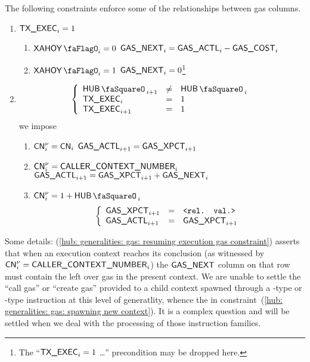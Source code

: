 The following constraints enforce some of the relationships between gas columns.
\begin{enumerate}
	\item \If $\textsf{TX}\textsf{\_EXEC}_{i} = 1$ \Then
		\begin{enumerate}
			\item \If $\xAhoy_{i} = 0$ \Then $\textsf{GAS}\textsf{\_NEXT}_{i} = \textsf{GAS}\textsf{\_ACTL}_{i} - \textsf{GAS}\textsf{\_COST}_{i}$
			\item \If $\xAhoy_{i} = 1$ \Then $\textsf{GAS}\textsf{\_NEXT}_{i} = 0$\footnote{The ``\If $\textsf{TX}\textsf{\_EXEC}_{i} = 1$ \Then \dots'' precondition may be dropped here.}
		\end{enumerate}
	\item \If 
		\[
			\left\{ \begin{array}{lcl}
				\hubStamp_{i + 1} & \neq & \hubStamp_{i} \\
				\txExec_{i}       & =    & 1             \\
				\txExec_{i + 1}   & =    & 1             \\
			\end{array} \right.
		\]
		\Then we impose
		\begin{enumerate}
			\item\label{hub: generalities: gas: could blow up} \If $\textsf{CN}^{\nu}_{i} = \textsf{CN}_{i}$ \Then $\textsf{GAS}\textsf{\_ACTL}_{i + 1} = \textsf{GAS}\textsf{\_XPCT}_{i + 1}$
			\item\label{hub: generalities: gas: resuming execution gas constraint} \If $\textsf{CN}^{\nu}_{i} = \textsf{CALLER\_CONTEXT\_NUMBER}_{i}$ \Then
				$\textsf{GAS}\textsf{\_ACTL}_{i + 1} = \textsf{GAS}\textsf{\_XPCT}_{i + 1} + \textsf{GAS}\textsf{\_NEXT}_{i}$
			\item\label{hub: generalities: gas: spawning new context} \If $\cn\new_{i} = 1 + \hubStamp_{i}$ \Then 
				\[
					\left\{ \begin{array}{lcl}
						\textsf{GAS}\textsf{\_XPCT}_{i + 1} & = & \texttt{<rel. val.>}            \\
						\textsf{GAS}\textsf{\_ACTL}_{i + 1}   & = & \textsf{GAS}\textsf{\_XPCT}_{i + 1} \\
					\end{array} \right.
				\]
		\end{enumerate}
\end{enumerate}
Some details:
(\ref{hub: generalities: gas: resuming execution gas constraint}) asserts that when an execution context reaches its conclusion (as witnessed by $\textsf{CN}^{\nu}_{i} = \textsf{CALLER\_CONTEXT\_NUMBER}_{i}$) the $\textsf{GAS}\textsf{\_NEXT}$ column on that row must contain the left over gas in the present context.
We are unable to settle the ``call gas'' or ``create gas'' provided to a child context spawned through a -type or -type instruction at this level of generatlity, whence the \relevantValue{} in constraint~(\ref{hub: generalities: gas: spawning new context}). It is a complex question and will be settled when we deal with the processing of those instruction families.

